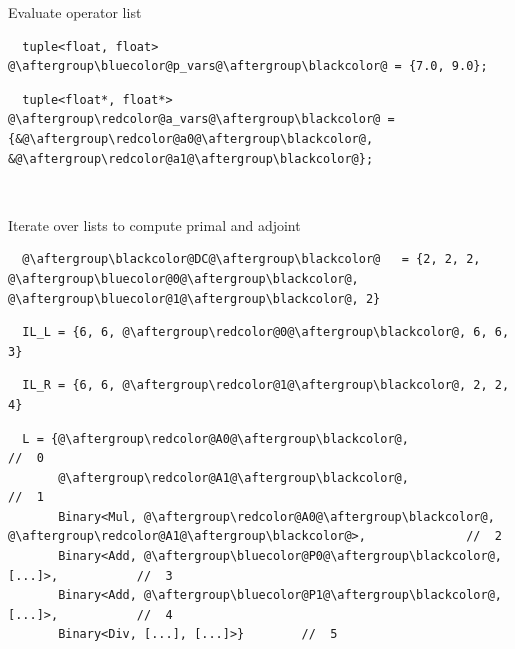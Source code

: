 \documentclass[xcolor=dvipsnames]{beamer}
\begin{document}
\begin{frame}[fragile]{Evaluate operator list}
\begin{lstlisting}
  tuple<float, float>   @\aftergroup\bluecolor@p_vars@\aftergroup\blackcolor@ = {7.0, 9.0};
\end{lstlisting}
\begin{lstlisting}
  tuple<float*, float*> @\aftergroup\redcolor@a_vars@\aftergroup\blackcolor@ = {&@\aftergroup\redcolor@a0@\aftergroup\blackcolor@, &@\aftergroup\redcolor@a1@\aftergroup\blackcolor@};
\end{lstlisting}

~

Iterate over lists to compute primal and adjoint
\begin{lstlisting}
  @\aftergroup\blackcolor@DC@\aftergroup\blackcolor@   = {2, 2, 2, @\aftergroup\bluecolor@0@\aftergroup\blackcolor@, @\aftergroup\bluecolor@1@\aftergroup\blackcolor@, 2}
\end{lstlisting}
\begin{lstlisting}
  IL_L = {6, 6, @\aftergroup\redcolor@0@\aftergroup\blackcolor@, 6, 6, 3}
\end{lstlisting}
\begin{lstlisting}
  IL_R = {6, 6, @\aftergroup\redcolor@1@\aftergroup\blackcolor@, 2, 2, 4}
\end{lstlisting}

\begin{lstlisting}
  L = {@\aftergroup\redcolor@A0@\aftergroup\blackcolor@,                               //  0
       @\aftergroup\redcolor@A1@\aftergroup\blackcolor@,                               //  1
       Binary<Mul, @\aftergroup\redcolor@A0@\aftergroup\blackcolor@, @\aftergroup\redcolor@A1@\aftergroup\blackcolor@>,              //  2
       Binary<Add, @\aftergroup\bluecolor@P0@\aftergroup\blackcolor@, [...]>,           //  3
       Binary<Add, @\aftergroup\bluecolor@P1@\aftergroup\blackcolor@, [...]>,           //  4
       Binary<Div, [...], [...]>}        //  5
\end{lstlisting}
\end{frame}
\end{document}
